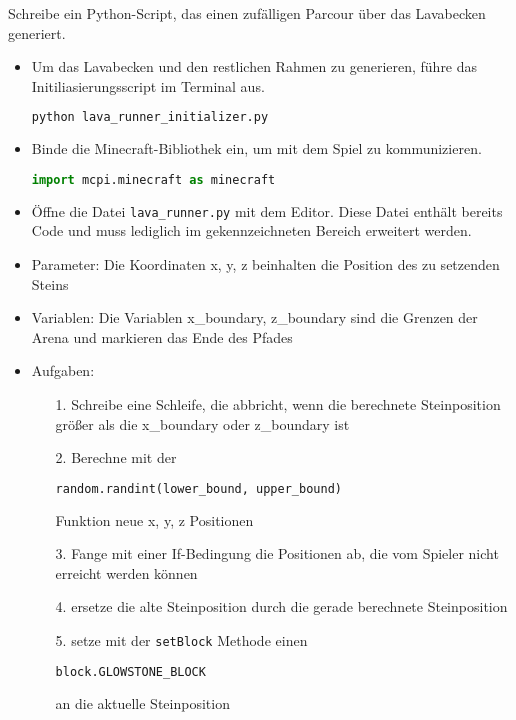 \large Schreibe ein Python-Script, das einen zufälligen Parcour über das Lavabecken generiert.
\begin{itemize}
	\item Um das Lavabecken und den restlichen Rahmen zu generieren, führe das Initiliasierungsscript im Terminal aus.
	\begin{lstlisting}[language=sh]
python lava_runner_initializer.py
	\end{lstlisting}
	\item Binde die Minecraft-Bibliothek ein, um mit dem Spiel zu kommunizieren.
	\begin{lstlisting}[language=Python]
import mcpi.minecraft as minecraft
	\end{lstlisting}
	
	\item Öffne die Datei \texttt{lava\_runner.py} mit dem Editor. Diese Datei enthält bereits Code und muss lediglich im gekennzeichneten Bereich erweitert werden.
	
	\item Parameter: Die Koordinaten x, y, z beinhalten die Position des zu setzenden Steins
	\item Variablen: Die Variablen x_boundary, z_boundary sind die Grenzen der Arena und markieren das Ende des Pfades
	\item Aufgaben:
	\begin{itemize}
		\item[1.] Schreibe eine Schleife, die abbricht, wenn die berechnete Steinposition größer als die x_boundary oder z_boundary ist
		\item[2.] Berechne mit der \begin{lstlisting}[language=Python]
		random.randint(lower_bound, upper_bound)
		\end{lstlisting} Funktion neue x, y, z Positionen
		\item[3.] Fange mit einer If-Bedingung die Positionen ab, die vom Spieler nicht erreicht werden können
		\item[4.] ersetze die alte Steinposition durch die gerade berechnete Steinposition
		\item[5.] setze mit der \texttt{setBlock} Methode einen \begin{lstlisting}[language=Python]
		block.GLOWSTONE_BLOCK
		\end{lstlisting} an die aktuelle Steinposition
	\end{itemize}
\end{itemize}